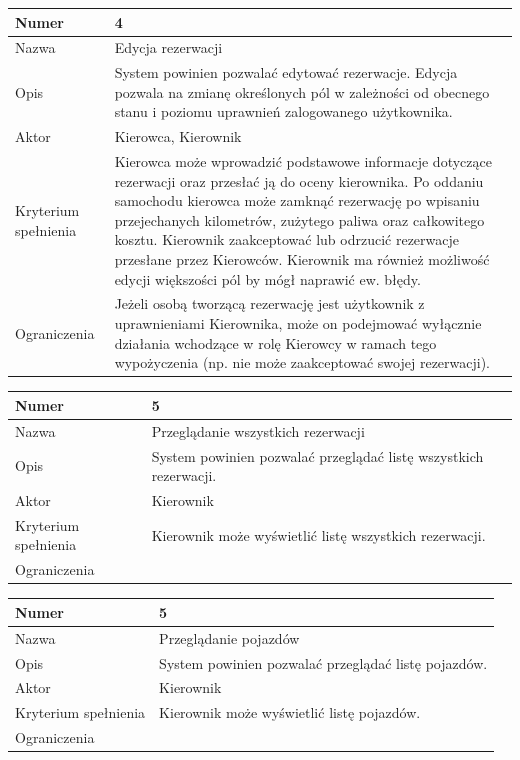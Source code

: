 \documentclass[eng,printmode,openany]{mgr}
\begin{document}
	\begin{table}[H]
		\begin{tabularx}{\textwidth}{|l|X|}
			\hline
			Numer                & 4  \\ \hline
			Nazwa                & Edycja rezerwacji\\ \hline
			Opis                 & System powinien pozwalać edytować rezerwacje. Edycja pozwala na zmianę określonych pól w zależności od obecnego stanu i poziomu uprawnień zalogowanego użytkownika. \\ \hline
			Aktor                & Kierowca, Kierownik \\ \hline
			Kryterium spełnienia & Kierowca może wprowadzić podstawowe informacje dotyczące rezerwacji oraz przesłać ją do oceny kierownika. Po oddaniu samochodu kierowca może zamknąć rezerwację po wpisaniu przejechanych kilometrów, zużytego paliwa oraz całkowitego kosztu. Kierownik zaakceptować lub odrzucić rezerwacje przesłane przez Kierowców. Kierownik ma również możliwość edycji większości pól by mógł naprawić ew. błędy. \\ \hline
			Ograniczenia         & Jeżeli osobą tworzącą rezerwację jest użytkownik z uprawnieniami Kierownika, może on podejmować wyłącznie działania wchodzące w rolę Kierowcy w ramach tego wypożyczenia (np. nie może zaakceptować swojej rezerwacji). \\ \hline
		\end{tabularx}
	\end{table}

	\begin{table}[H]
		\begin{tabularx}{\textwidth}{|l|X|}
			\hline
			Numer                & 5  \\ \hline
			Nazwa                & Przeglądanie wszystkich rezerwacji \\ \hline
			Opis                 & System powinien pozwalać przeglądać listę wszystkich rezerwacji. \\ \hline
			Aktor                & Kierownik \\ \hline
			Kryterium spełnienia & Kierownik może wyświetlić listę wszystkich rezerwacji. \\ \hline
			Ograniczenia         &  \\ \hline
		\end{tabularx}
	\end{table}	

	\begin{table}[H]
		\begin{tabularx}{\textwidth}{|l|X|}
			\hline
			Numer                & 5  \\ \hline
			Nazwa                & Przeglądanie pojazdów \\ \hline
			Opis                 & System powinien pozwalać przeglądać listę pojazdów. \\ \hline
			Aktor                & Kierownik \\ \hline
			Kryterium spełnienia & Kierownik może wyświetlić listę pojazdów. \\ \hline
			Ograniczenia         &  \\ \hline
		\end{tabularx}
	\end{table}	
\end{document}
